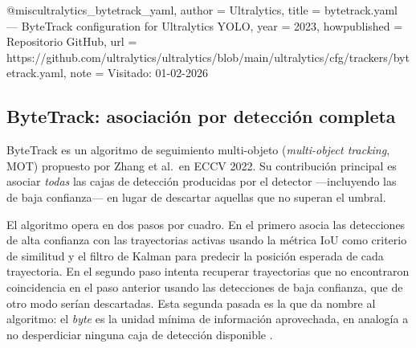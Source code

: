 @misc{ultralytics_bytetrack_yaml,
  author       = {{Ultralytics}},
  title        = {bytetrack.yaml — ByteTrack configuration for Ultralytics YOLO},
  year         = {2023},
  howpublished = {Repositorio GitHub},
  url          = {https://github.com/ultralytics/ultralytics/blob/main/ultralytics/cfg/trackers/bytetrack.yaml},
  note         = {Visitado: 01-02-2026}
}


%
%


\subsection{ByteTrack: asociación por detección completa}

ByteTrack \cite{zhang2022_bytetrack} es un algoritmo de seguimiento
multi-objeto (\textit{multi-object tracking}, MOT) propuesto por Zhang et
al.\ en ECCV 2022. Su contribución principal es asociar \emph{todas} las
cajas de detección producidas por el detector ---incluyendo las de baja
confianza--- en lugar de descartar aquellas que no superan el umbral.

El algoritmo opera en dos pasos por cuadro. En el primero asocia las
detecciones de alta confianza con las trayectorias activas usando la métrica
IoU como criterio de similitud y el filtro de Kalman para predecir la
posición esperada de cada trayectoria. En el segundo paso intenta recuperar
trayectorias que no encontraron coincidencia en el paso anterior usando las
detecciones de baja confianza, que de otro modo serían descartadas. Esta
segunda pasada es la que da nombre al algoritmo: el \textit{byte} es la
unidad mínima de información aprovechada, en analogía a no desperdiciar
ninguna caja de detección disponible \cite{zhang2022_bytetrack}.

